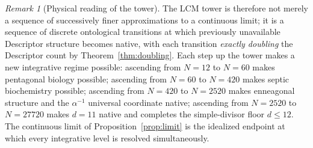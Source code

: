 \documentclass[11pt,a4paper]{article}
\theoremstyle{definition}
\theoremstyle{remark}
\newtheorem{remark}[theorem]{Remark}
\begin{document}
\begin{remark}[Physical reading of the tower]
The LCM tower is therefore not merely a sequence of successively finer approximations to a continuous limit; it is a sequence of discrete ontological transitions at which previously unavailable Descriptor structure becomes native, with each transition \emph{exactly doubling} the Descriptor count by Theorem~\ref{thm:doubling}. Each step up the tower makes a new integrative regime possible: ascending from $N=12$ to $N=60$ makes pentagonal biology possible; ascending from $N=60$ to $N=420$ makes septic biochemistry possible; ascending from $N=420$ to $N=2520$ makes enneagonal structure and the $\alpha^{-1}$ universal coordinate native; ascending from $N=2520$ to $N=27720$ makes $d=11$ native and completes the simple-divisor floor $d\le 12$. The continuous limit of Proposition~\ref{prop:limit} is the idealized endpoint at which every integrative level is resolved simultaneously.
\end{remark}
\end{document}
